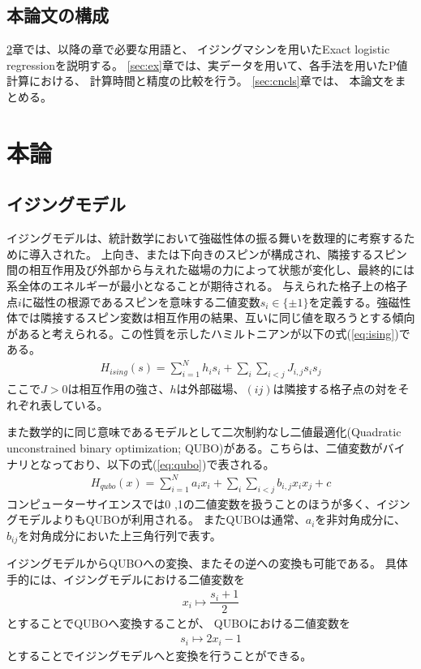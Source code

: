 \documentclass[12pt, dvipdfmx]{jmaster}
\theoremstyle{definition}
\begin{document}
\section{本論文の構成}
\ref{sec:propose}章では、以降の章で必要な用語と、
イジングマシンを用いたExact logistic regressionを説明する。 
\ref{sec:ex}章では、実データを用いて、各手法を用いたP値計算における、
計算時間と精度の比較を行う。
\ref{sec:cncls}章では、 本論文をまとめる。

\chapter{本論}
\label{sec:propose}

\section{イジングモデル}
イジングモデルは、統計数学において強磁性体の振る舞いを数理的に考察するために導入された。
上向き、または下向きのスピンが構成され、隣接するスピン間の相互作用及び外部から与えれた磁場の力によって状態が変化し、最終的には系全体のエネルギーが最小となることが期待される。
与えられた格子上の格子点$i$に磁性の根源であるスピンを意味する二値変数$s_i  \in\{\pm 1\}$を定義する。強磁性体では隣接するスピン変数は相互作用の結果、互いに同じ値を取ろうとする傾向があると考えられる。この性質を示したハミルトニアンが以下の式(\ref{eq:ising})である。
\begin{eqnarray}
	H_{ising}(s) = \sum_{i=1}^{N}h_i s_i +  \sum_{i}\sum_{i<j}J_{i, j} s_i s_j
	\label{eq:ising}
\end{eqnarray}
ここで$J > 0$は相互作用の強さ、$h$は外部磁場、$(ij)$は隣接する格子点の対をそれぞれ表している。

また数学的に同じ意味であるモデルとして二次制約なし二値最適化(Quadratic unconstrained binary optimization; QUBO)がある。こちらは、二値変数がバイナリとなっており、以下の式(\ref{eq:qubo})で表される。
\begin{eqnarray}
	H_{qubo}(x) = \sum_{i=1}^{N}a_i x_i +  \sum_{i}\sum_{i<j}b_{i, j} x_i x_j + c
	\label{eq:qubo}
\end{eqnarray}
コンピューターサイエンスでは0 ,1の二値変数を扱うことのほうが多く、イジングモデルよりもQUBOが利用される。
またQUBOは通常、$a_i$を非対角成分に、$b_{ij}$を対角成分においた上三角行列で表す。

イジングモデルからQUBOへの変換、またその逆への変換も可能である。
具体手的には、イジングモデルにおける二値変数を
\begin{eqnarray}
	x_i \mapsto　\dfrac{s_i + 1}{2}
\end{eqnarray}
とすることでQUBOへ変換することが、
QUBOにおける二値変数を
\begin{eqnarray}
	s_i \mapsto　2x_i - 1
\end{eqnarray}
とすることでイジングモデルへと変換を行うことができる。
\end{document}
